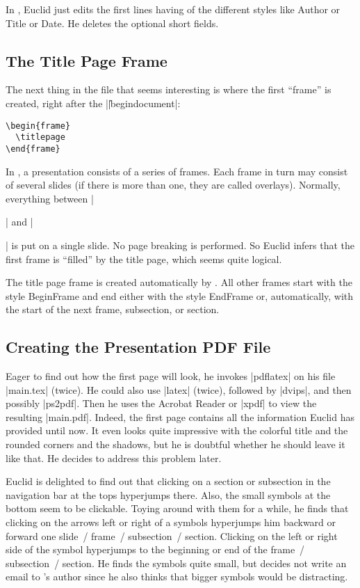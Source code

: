 \lyxnote
In \LyX, Euclid just edits the first lines having of the different
styles like Author or Title or Date. He deletes the optional short
fields.


\subsection{The Title Page Frame}

The next thing in the file that seems interesting is where the first
``frame'' is created, right after the |\||begin{document}|:

\begin{verbatim}
\begin{frame}
  \titlepage
\end{frame}
\end{verbatim}

In \beamer, a presentation consists of a series of frames. Each frame
in turn may consist of several slides (if there is more than one, they
are called overlays). Normally, everything between |\begin{frame}|
  and |\end{frame}| is put on a single slide. No page breaking is
performed. So Euclid infers that the first frame is ``filled'' by the
title page, which seems quite logical.

\lyxnote
The title page frame is created automatically by \LyX. All other
frames start with the style BeginFrame and end either with the style
EndFrame or, automatically, with the start of the next frame,
subsection, or section.


\subsection{Creating the Presentation PDF File}

Eager to find out how the first page will
look, he invokes |pdflatex| on his file |main.tex| (twice). He could
also use |latex| (twice), followed by |dvips|, and then possibly
|ps2pdf|. Then he uses the Acrobat Reader or |xpdf| to view the
resulting |main.pdf|. Indeed, the first page contains all the
information Euclid has provided until now. It even looks quite
impressive with the colorful title and the rounded corners and the
shadows, but he is doubtful whether he should leave it like that. He
decides to address this problem later.

Euclid is delighted to find out that clicking on a section or
subsection in the navigation bar at the tops hyperjumps there. Also,
the small symbols at the bottom seem to be clickable. Toying around
with them for a while, he finds that clicking on the arrows left or
right of a symbols hyperjumps him backward or forward one slide~/
frame~/ subsection~/ section. Clicking on the left or right side of
the symbol hyperjumps to the beginning or end of the frame~/
subsection~/ section. He finds the symbols quite small, but decides
not write an email to \beamer's author since he also thinks that
bigger symbols would be distracting.

